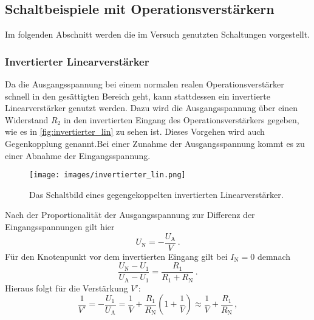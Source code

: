     \subsection{Schaltbeispiele mit Operationsverstärkern}

        \noindent 
        Im folgenden Abschnitt werden die im Versuch genutzten Schaltungen vorgestellt. 

        \subsubsection{Invertierter Linearverstärker}

            \noindent 
            Da die Ausgangsspannung bei einem normalen realen Operationsverstärker schnell in den gesättigten Bereich geht, kann stattdessen ein invertierte Linearverstärker 
            genutzt werden. 
            Dazu wird die Ausgangsspannung über einen Widerstand $R_2$ in den invertierten Eingang des Operationsverstärkers gegeben, wie es in \autoref{fig:invertierter_lin}
            zu sehen ist.
            Dieses Vorgehen wird auch Gegenkopplung genannt.Bei einer Zunahme der Ausgangsspannung kommt es zu einer Abnahme der Eingangsspannung. 
            \begin{figure}[H]%
                \centering%
                \texttt{[image: images/invertierter\_lin.png]}%
                \caption{Das Schaltbild eines gegengekoppelten invertierten Linearverstärker. \cite{V51}}%
                \label{fig:invertierter_lin}%
            \end{figure}%
            \noindent
            Nach der Proportionalität der Ausgangsspannung zur Differenz der Eingangsspannungen gilt hier 
            \begin{equation}
                U_\text{N} = - \frac{U_\text{A}}{V}\, .
            \end{equation}
            Für den Knotenpunkt vor dem invertierten Eingang gilt bei $I_\text{N} = 0$ demnach 
            \begin{equation*}
                \frac{U_\text{N} - U_1}{U_\text{A} - U_1} = \frac{R_1}{R_1 + R_\text{N}}\, .
            \end{equation*}
            Hieraus folgt für die Verstärkung $V'$: 
            \begin{equation*}
                \frac{1}{V'} = - \frac{U_1}{U_\text{A}} = \frac{1}{V} + \frac{R_1}{R_\text{N}}\left(1 + \frac{1}{V}\right) \approx \frac{1}{V} + \frac{R_1}{R_\text{N}}\, ,
            \end{equation*}

